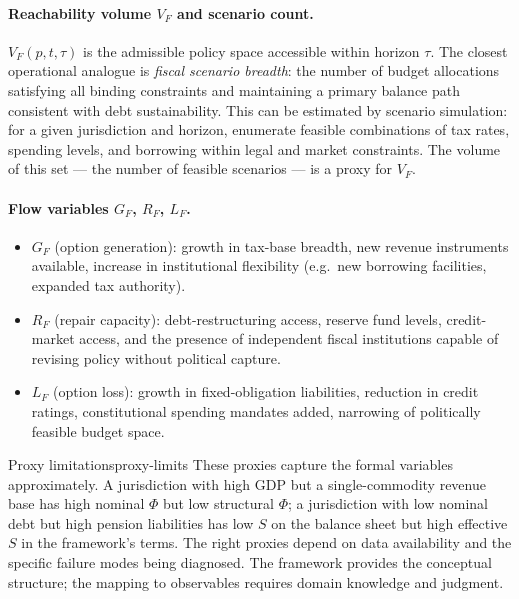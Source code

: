 \documentclass[12pt,twoside,openright]{book}
\begin{document}
\paragraph{Reachability volume $V_F$ and scenario count.}
$V_F(p,t,\tau)$ is the admissible policy space accessible
within horizon $\tau$. The closest operational analogue is
\emph{fiscal scenario breadth}: the number of budget
allocations satisfying all binding constraints and
maintaining a primary balance path consistent with debt
sustainability. This can be estimated by scenario
simulation: for a given jurisdiction and horizon, enumerate
feasible combinations of tax rates, spending levels, and
borrowing within legal and market constraints. The volume
of this set --- the number of feasible scenarios --- is
a proxy for $V_F$.

\paragraph{Flow variables $G_F$, $R_F$, $L_F$.}
\begin{itemize}[nosep]
  \item $G_F$ (option generation): growth in tax-base
        breadth, new revenue instruments available,
        increase in institutional flexibility (e.g.\
        new borrowing facilities, expanded tax authority).
  \item $R_F$ (repair capacity): debt-restructuring
        access, reserve fund levels, credit-market
        access, and the presence of independent fiscal
        institutions capable of revising policy without
        political capture.
  \item $L_F$ (option loss): growth in fixed-obligation
        liabilities, reduction in credit ratings,
        constitutional spending mandates added,
        narrowing of politically feasible budget space.
\end{itemize}

\begin{remark}{Proxy limitations}{proxy-limits}
  These proxies capture the formal variables
  approximately. A jurisdiction with high GDP but a
  single-commodity revenue base has high nominal $\Phi$
  but low structural $\Phi$; a jurisdiction with low
  nominal debt but high pension liabilities has low
  $S$ on the balance sheet but high effective $S$ in
  the framework's terms. The right proxies depend on
  data availability and the specific failure modes being
  diagnosed. The framework provides the conceptual
  structure; the mapping to observables requires
  domain knowledge and judgment.
\end{remark}
\end{document}
